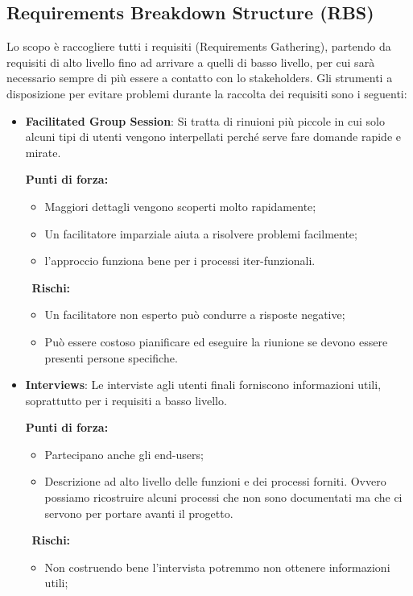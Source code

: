 \subsection{Requirements Breakdown Structure (RBS)}
Lo scopo è raccogliere tutti i requisiti (Requirements Gathering), partendo da requisiti di alto livello fino ad arrivare a quelli di basso livello, per cui sarà necessario sempre di più essere a contatto con lo stakeholders. Gli strumenti a disposizione per evitare problemi durante la raccolta dei requisiti sono i seguenti:
\begin{itemize}
	\item \textbf{Facilitated Group Session}:  Si tratta di rinuioni più piccole in cui solo alcuni tipi di utenti vengono interpellati perché serve fare domande rapide e mirate.
	\begin{info}[]
		\textbf{Punti di forza:}
		\begin{itemize}
			\item Maggiori dettagli vengono scoperti molto rapidamente;
			\item Un facilitatore imparziale aiuta a risolvere problemi facilmente;
			\item l'approccio funziona bene per i processi iter-funzionali.
		\end{itemize}
		$\;\;$\textbf{Rischi:}
		\begin{itemize}
			\item Un facilitatore non esperto può condurre a risposte negative;
			\item Può essere costoso pianificare ed eseguire la riunione se devono essere presenti persone specifiche.
		\end{itemize}
	\end{info}
	\item \textbf{Interviews}: Le interviste agli utenti finali forniscono informazioni utili, soprattutto per i requisiti a basso livello.
	\begin{info}[]
		\textbf{Punti di forza:}
		\begin{itemize}
			\item Partecipano anche gli end-users;
			\item Descrizione ad alto livello delle funzioni e dei processi forniti. Ovvero possiamo ricostruire alcuni processi che non sono documentati ma che ci servono per portare avanti il progetto.
		\end{itemize}
		$\;\;$\textbf{Rischi:}
		\begin{itemize}
			\item Non costruendo bene l'intervista potremmo non ottenere informazioni utili;

\end{itemize}
\end{info}
\end{itemize}
